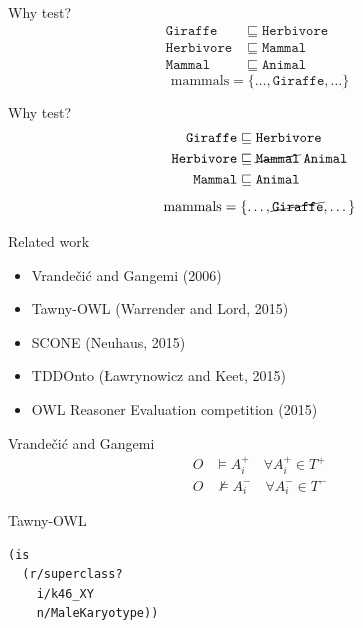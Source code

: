 \documentclass[17pt,mathserif]{beamer}
\newcommand{\oclass}[1]{\ensuremath{\mathtt{#1}}}
\newcommand{\osub}{\sqsubseteq}
\begin{document}
\begin{frame}{Why test?}
  \begin{align*}
    \oclass{Giraffe} &\osub \oclass{Herbivore} \\
    \oclass{Herbivore} &\osub \oclass{Mammal} \phantom{\; \oclass{Animal}} \\
    \oclass{Mammal} &\osub \oclass{Animal}
  \end{align*}
  \[ \mathrm{mammals} = \{\dots, \oclass{Giraffe} ,\dots\} \]
\end{frame}

\begin{frame}{Why test?}
  \begin{align*}
    \oclass{Giraffe} &\osub \oclass{Herbivore} \\
    \oclass{Herbivore} &\osub \cancel{\oclass{Mammal}} \; \oclass{Animal} \\
    \oclass{Mammal} &\osub \oclass{Animal}
  \end{align*}
  \[ \mathrm{mammals} = \{\dots, \cancel{\oclass{Giraffe}} ,\dots\} \]
\end{frame}

\begin{frame}{Related work}
  \begin{itemize}
    \item Vrande\v{c}i\'c and Gangemi (2006)
    \item Tawny-OWL (Warrender and Lord, 2015)
    \item SCONE (Neuhaus, 2015)
    \item TDDOnto ({\L}awrynowicz and Keet, 2015)
    \item OWL Reasoner Evaluation competition (2015)
  \end{itemize}
\end{frame}

\begin{frame}{Vrande\v{c}i\'c and Gangemi}
  \begin{align*}
    O &\models A_i^{+} \quad \forall A_i^{+} \in T^{+} \\
    O &\not\models A_i^{-} \quad \forall A_i^{-} \in T^{-}
  \end{align*}
\end{frame}

\begin{frame}[fragile]{Tawny-OWL}
  \begin{lstlisting}[language=Lisp,basicstyle=\normalsize\ttfamily]
(is
  (r/superclass?
    i/k46_XY
    n/MaleKaryotype))
  \end{lstlisting}
\end{frame}
\end{document}
